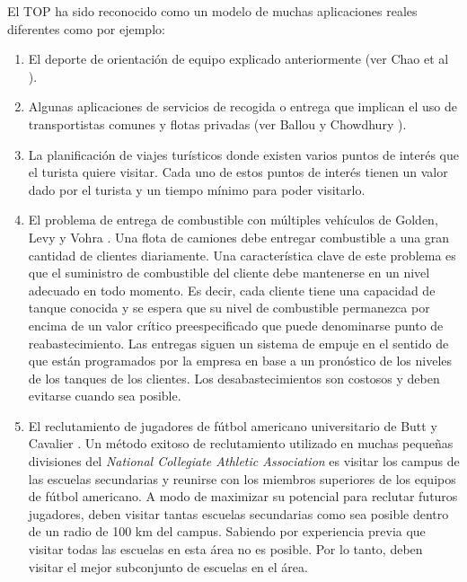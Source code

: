 El TOP ha sido reconocido como un modelo de muchas aplicaciones reales diferentes como por ejemplo:

\begin{enumerate}[i]

\item

El deporte de orientación de equipo explicado anteriormente (ver Chao et al \cite{ChaoGoldenWasil}). 

\item

Algunas aplicaciones de servicios de recogida o entrega que implican el uso de transportistas comunes y flotas privadas (ver Ballou y Chowdhury \cite{BallouChowdhury}). 

\item

La planificación de viajes turísticos donde existen varios puntos de interés que el turista quiere visitar. Cada uno de estos puntos de interés tienen un valor dado por el turista y un tiempo mínimo para poder visitarlo.

\item

El problema de entrega de combustible con múltiples vehículos de Golden, Levy y Vohra \cite{GoldenLevyVohra}. Una flota de camiones debe entregar combustible a una gran cantidad de clientes diariamente. Una característica clave de este problema es que el suministro de combustible del cliente debe mantenerse en un nivel adecuado en todo momento. Es decir, cada cliente tiene una capacidad de tanque conocida y se espera que su nivel de combustible permanezca por encima de un valor crítico preespecificado que puede denominarse punto de reabastecimiento. Las entregas siguen un sistema de empuje en el sentido de que están programados por la empresa en base a un pronóstico de los niveles de los tanques de los clientes. Los desabastecimientos son costosos y deben evitarse cuando sea posible.

\item

El reclutamiento de jugadores de fútbol americano universitario de Butt y Cavalier \cite{ButtCavalier}. Un método exitoso de reclutamiento utilizado en muchas pequeñas divisiones del \textit{National Collegiate Athletic Association} es visitar los campus de las escuelas secundarias y reunirse con los miembros superiores de los equipos de fútbol americano. A modo de maximizar su potencial para reclutar futuros jugadores, deben visitar tantas escuelas secundarias como sea posible dentro de un radio de 100 km del campus. Sabiendo por experiencia previa que visitar todas las escuelas en esta área no es posible. Por lo tanto, deben visitar el mejor subconjunto de escuelas en el área.


\end{enumerate}
